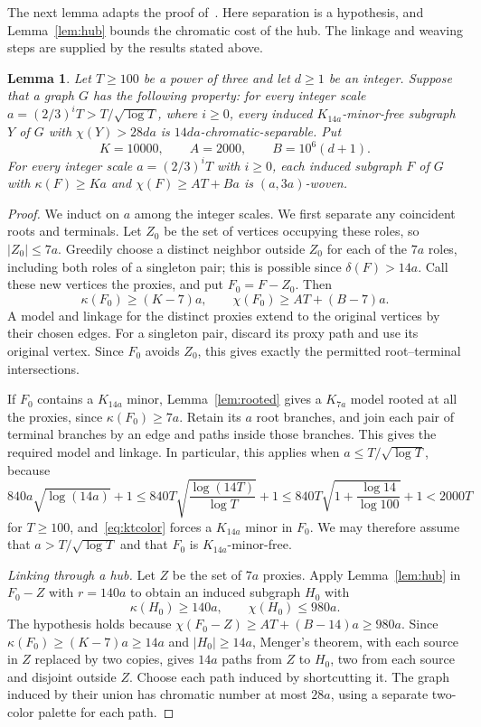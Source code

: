 \documentclass[11pt]{article}
\newtheorem{lemma}[theorem]{Lemma}
\begin{document}
The next lemma adapts the proof of~\cite[Theorem~7.1]{DP}.
Here separation is a hypothesis, and Lemma~\ref{lem:hub} bounds the
chromatic cost of the hub. The linkage and weaving steps are supplied
by the results stated above.
\begin{lemma}\label{lem:outer}
Let $T\ge100$ be a power of three and let $d\ge1$ be an integer.
Suppose that a graph $G$ has the following property: for every integer
scale $a=(2/3)^iT>T/\sqrt{\log T}$, where $i\ge0$, every induced
$K_{14a}$-minor-free subgraph $Y$ of $G$ with $\chi(Y)>28da$ is
$14da$-chromatic-separable.
Put
\[
 K=10000,\qquad A=2000,\qquad B=10^6(d+1).
\]
For every integer scale $a=(2/3)^iT$ with $i\ge0$, each induced subgraph $F$ of $G$
with $\kappa(F)\ge Ka$ and $\chi(F)\ge AT+Ba$ is $(a,3a)$-woven.
\end{lemma}
\begin{proof}
We induct on $a$ among the integer scales. We first separate any
coincident roots and terminals. Let $Z_0$ be the set of vertices
occupying these roles, so $|Z_0|\le7a$. Greedily choose a distinct
neighbor outside $Z_0$ for each of the $7a$ roles, including both
roles of a singleton pair; this is possible since $\delta(F)>14a$.
Call these new vertices the proxies, and put $F_0=F-Z_0$. Then
\[
 \kappa(F_0)\ge(K-7)a,\qquad
 \chi(F_0)\ge AT+(B-7)a.
\]
A model and linkage for the distinct proxies extend to the original
vertices by their chosen edges. For a singleton pair, discard its
proxy path and use its original vertex. Since $F_0$ avoids $Z_0$,
this gives exactly the permitted root--terminal intersections.

If $F_0$ contains a $K_{14a}$ minor, Lemma~\ref{lem:rooted} gives
a $K_{7a}$ model rooted at all the proxies, since
$\kappa(F_0)\ge7a$. Retain its $a$ root branches, and join each pair
of terminal branches by an edge and paths inside those branches.
This gives the required model and linkage.
In particular, this applies when $a\le T/\sqrt{\log T}$, because
\[
 840a\sqrt{\log(14a)}+1
 \le840T\sqrt{\frac{\log(14T)}{\log T}}+1
 \le840T\sqrt{1+\frac{\log14}{\log100}}+1
 <2000T
\]
for $T\ge100$, and~\eqref{eq:ktcolor} forces a $K_{14a}$ minor
in $F_0$. We may therefore assume that $a>T/\sqrt{\log T}$ and
that $F_0$ is $K_{14a}$-minor-free.

\medskip\noindent\emph{Linking through a hub.}
Let $Z$ be the set of $7a$ proxies. Apply Lemma~\ref{lem:hub} in
$F_0-Z$ with $r=140a$ to obtain an induced subgraph $H_0$ with
\[
 \kappa(H_0)\ge140a,\qquad \chi(H_0)\le980a.
\]
The hypothesis holds because $\chi(F_0-Z)\ge AT+(B-14)a\ge980a$.
Since $\kappa(F_0)\ge(K-7)a\ge14a$ and $|H_0|\ge14a$,
Menger's theorem,
with each source in $Z$ replaced by two copies, gives $14a$ paths
from $Z$ to $H_0$, two from each source and disjoint outside $Z$.
Choose each path induced by shortcutting it. The graph induced by
their union has chromatic number at most $28a$, using a separate
two-color palette for each path.


\end{proof}
\end{document}

